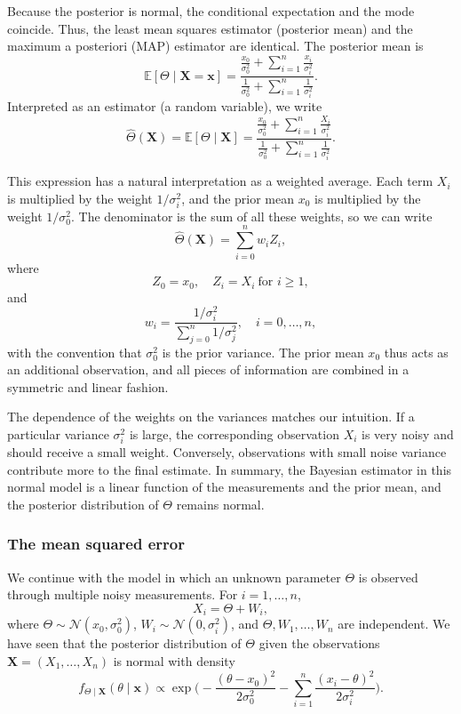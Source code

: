 Because the posterior is normal, the conditional expectation and the mode coincide.  
Thus, the least mean squares estimator (posterior mean) and the maximum a posteriori (MAP) estimator are identical.  
The posterior mean is
\[
\mathbb{E}[\Theta \mid \mathbf{X} = \mathbf{x}]
=
\frac{\displaystyle \frac{x_0}{\sigma_{0}^{2}} + \sum_{i=1}^{n}\frac{x_i}{\sigma_{i}^{2}}}{\displaystyle \frac{1}{\sigma_{0}^{2}} + \sum_{i=1}^{n}\frac{1}{\sigma_{i}^{2}}}.
\]
Interpreted as an estimator (a random variable), we write
\[
\hat{\Theta}(\mathbf{X})
=
\mathbb{E}[\Theta \mid \mathbf{X}]
=
\frac{\displaystyle \frac{x_0}{\sigma_{0}^{2}} + \sum_{i=1}^{n}\frac{X_i}{\sigma_{i}^{2}}}{\displaystyle \frac{1}{\sigma_{0}^{2}} + \sum_{i=1}^{n}\frac{1}{\sigma_{i}^{2}}}.
\]

This expression has a natural interpretation as a weighted average.  
Each term \(X_i\) is multiplied by the weight \(1/\sigma_{i}^{2}\), and the prior mean \(x_0\) is multiplied by the weight \(1/\sigma_{0}^{2}\).  
The denominator is the sum of all these weights, so we can write
\[
\hat{\Theta}(\mathbf{X})
=
\sum_{i=0}^{n} w_i Z_i,
\]
where
\[
Z_0 = x_0,\quad Z_i = X_i\ \text{for } i\ge 1,
\]
and
\[
w_i
=
\frac{1/\sigma_{i}^{2}}{\displaystyle \sum_{j=0}^{n}1/\sigma_{j}^{2}},
\quad
i = 0,\dots,n,
\]
with the convention that \(\sigma_{0}^{2}\) is the prior variance.  
The prior mean \(x_0\) thus acts as an additional observation, and all pieces of information are combined in a symmetric and linear fashion.

The dependence of the weights on the variances matches our intuition.  
If a particular variance \(\sigma_{i}^{2}\) is large, the corresponding observation \(X_i\) is very noisy and should receive a small weight.  
Conversely, observations with small noise variance contribute more to the final estimate.  
In summary, the Bayesian estimator in this normal model is a linear function of the measurements and the prior mean, and the posterior distribution of \(\Theta\) remains normal.



\subsubsection{The mean squared error}

We continue with the model in which an unknown parameter \(\Theta\) is observed through multiple noisy measurements.  
For \(i = 1,\dots,n\),
\[
X_i
=
\Theta + W_i,
\]
where \(\Theta \sim \mathcal{N}(x_0,\sigma_{0}^{2})\), \(W_i \sim \mathcal{N}(0,\sigma_{i}^{2})\), and \(\Theta,W_1,\dots,W_n\) are independent.  
We have seen that the posterior distribution of \(\Theta\) given the observations \(\mathbf{X} = (X_1,\dots,X_n)\) is normal with density
\[
f_{\Theta\mid \mathbf{X}}(\theta\mid \mathbf{x})
\propto
\exp\Bigg(
-\frac{(\theta - x_0)^{2}}{2\sigma_{0}^{2}}
-
\sum_{i=1}^{n}\frac{(x_i-\theta)^{2}}{2\sigma_{i}^{2}}
\Bigg).
\]

